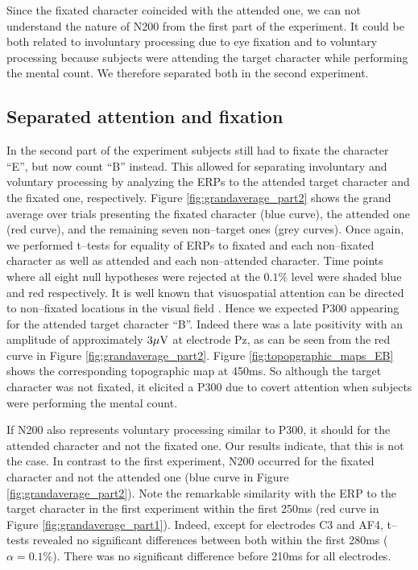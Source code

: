 \documentclass[a4paper,twocolumn]{article}
\begin{document}
Since the fixated character coincided with the attended one, we can not understand the nature of N200 from the first part of the experiment. It could be both related to involuntary processing due to eye fixation and to voluntary processing because subjects were attending the target character while performing the mental count. We therefore separated both in the second experiment.
\subsection*{Separated attention and fixation}
In the second part of the experiment subjects still had to fixate the character ``E'', but now count ``B'' instead. This allowed for separating involuntary and voluntary processing by analyzing the ERPs to the attended target character and the fixated one, respectively. Figure \ref{fig:grandaverage_part2} shows the grand average over trials presenting the fixated character (blue curve), the attended one (red curve), and the remaining seven non--target ones (grey curves). Once again, we performed t--tests for equality of ERPs to fixated and each non--fixated character as well as attended and each non--attended character. Time points where all eight null hypotheses were rejected at the $0.1\%$ level were shaded blue and red respectively. 
It is well known that visuospatial attention can be directed to non--fixated locations in the visual field \cite{Posner1980}. Hence we expected P300 appearing for the attended target character ``B''. Indeed there was a late positivity with an amplitude of approximately $3 \mu\rm{V}$ at electrode Pz, as can be seen from the red curve in Figure \ref{fig:grandaverage_part2}. Figure \ref{fig:topopgraphic_maps_EB} shows the corresponding topographic map at 450ms. So although the target character was not fixated, it elicited a P300 due to covert attention when subjects were performing the mental count. 

If N200 also represents voluntary processing similar to P300, it should  for the attended character and not the fixated one. Our results indicate, that this is not the case. In contrast to the first experiment, N200 occurred for the fixated character and not the attended one (blue curve in Figure \ref{fig:grandaverage_part2}). Note the remarkable similarity with the ERP to the target character in the first experiment within the first 250ms (red curve in Figure \ref{fig:grandaverage_part1}). Indeed, except for electrodes C3 and AF4, t--tests revealed no significant differences between both within the first 280ms ($\alpha=0.1\%$). There was no significant difference before 210ms for all electrodes.
\end{document}
